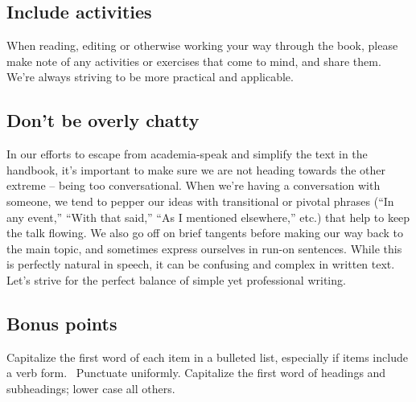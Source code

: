 \subsection{Include activities}

When reading, editing or otherwise working your way through the book,
please make note of any activities or exercises that come to mind, and
share them.~ We're always striving to be more practical and applicable.

\subsection{Don't be overly chatty}

In our efforts to escape from academia-speak and simplify the text in
the handbook, it's important to make sure we are not heading towards the
other extreme -- being too conversational. When we're having a
conversation with someone, we tend to pepper our ideas with transitional
or pivotal phrases (``In any event,'' ``With that said,'' ``As I
mentioned elsewhere,'' etc.) that help to keep the talk flowing. We also
go off on brief tangents before making our way back to the main topic,
and sometimes express ourselves in run-on sentences. While this is
perfectly natural in speech, it can be confusing and complex in written
text. Let's strive for the perfect balance of simple yet professional
writing.

\subsection{Bonus points}

Capitalize the first word of each item in a bulleted list, especially
if items include a verb form.~ Punctuate
uniformly.
Capitalize the first word of headings and subheadings; lower case all
others.



